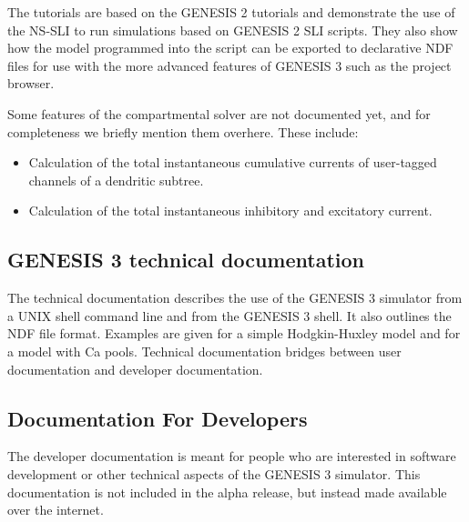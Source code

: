 \documentclass[12pt]{article}
\begin{document}
The tutorials are based on the GENESIS 2 tutorials and demonstrate the
use of the NS-SLI to run simulations based on GENESIS 2 SLI scripts.
They also show how the model programmed into the script can be
exported to declarative NDF files for use with the more advanced
features of GENESIS 3 such as the project browser.

Some features of the compartmental solver are not documented yet, and
for completeness we briefly mention them overhere.  These include:
\begin{itemize}
\item Calculation of the total instantaneous cumulative currents of
  user-tagged channels of a dendritic subtree.
\item Calculation of the total instantaneous inhibitory and excitatory
  current.
\end{itemize}


\subsection{GENESIS 3 technical documentation}
The technical documentation describes the use of the GENESIS 3
simulator from a UNIX shell command line and from the GENESIS 3 shell.
It also outlines the NDF file format.  Examples are given for a simple
Hodgkin-Huxley model and for a model with Ca pools.  Technical
documentation bridges between user documentation and developer
documentation.

\subsection{Documentation For Developers}

The developer documentation is meant for people who are interested in
software development or other technical aspects of the GENESIS 3
simulator.  This documentation is not included in the alpha release,
but instead made available over the internet.
\end{document}
